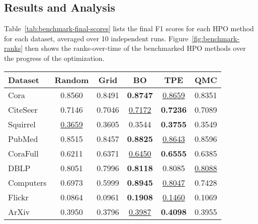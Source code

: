 \subsection{Results and Analysis}
Table~\ref{tab:benchmark-final-scores} lists the final F1 scores for each HPO method for each dataset, averaged over 10 independent runs. Figure~\ref{fig:benchmark-ranks} then shows the ranks-over-time of the benchmarked HPO methods over the progress of the optimization.

\begin{table*}
	\caption{Final F1 scores for each HPO method and for each dataset, averaged over 10 independent runs. The best method is \textbf{bold} and the second best is \underline{underlined}.}
	\label{tab:benchmark-final-scores}
	\centering
	\begin{tabular}{lccccc}
		\toprule
		\textbf{Dataset} & \textbf{Random}    & \textbf{Grid} & \textbf{BO}        & \textbf{TPE}       & \textbf{QMC}       \\
		\midrule
		Cora             & 0.8560             & 0.8491        & \textbf{0.8747}    & \underline{0.8659} & 0.8351             \\
		CiteSeer         & 0.7146             & 0.7046        & \underline{0.7172} & \textbf{0.7236}    & 0.7089             \\
		Squirrel         & \underline{0.3659} & 0.3605        & 0.3544             & \textbf{0.3755}    & 0.3549             \\
		PubMed           & 0.8515             & 0.8457        & \textbf{0.8825}    & \underline{0.8643} & 0.8596             \\
		CoraFull         & 0.6211             & 0.6371        & \underline{0.6450} & \textbf{0.6555}    & 0.6385             \\
		DBLP             & 0.8051             & 0.7996        & \textbf{0.8118}    & 0.8085             & \underline{0.8088} \\
		Computers        & 0.6973             & 0.5999        & \textbf{0.8945}    & \underline{0.8047} & 0.7428             \\
		Flickr           & 0.0864             & 0.0961        & \textbf{0.1908}    & \underline{0.1460} & 0.1069             \\
		ArXiv            & 0.3950             & 0.3796        & \underline{0.3987} & \textbf{0.4098}    & 0.3955             \\
		\bottomrule
	\end{tabular}
\end{table*}

